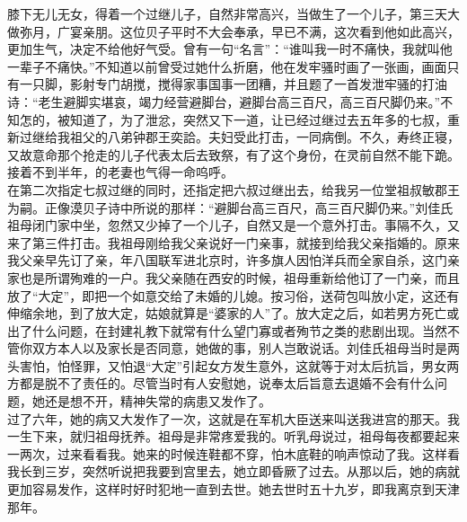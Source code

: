 膝下无儿无女，得着一个过继儿子，自然非常高兴，当做生了一个儿子，第三天大做弥月，广宴亲朋。这位贝子平时不大会奉承，早已不满，这次看到他如此高兴，更加生气，决定不给他好气受。曾有一句“名言”：“谁叫我一时不痛快，我就叫他一辈子不痛快。”不知道以前曾受过她什么折磨，他在发牢骚时画了一张画，画面只有一只脚，影射专门胡搅，搅得家事国事一团糟，并且题了一首发泄牢骚的打油诗：“老生避脚实堪哀，竭力经营避脚台，避脚台高三百尺，高三百尺脚仍来。”不知怎的，被知道了，为了泄忿，突然又下一道，让已经过继过去五年多的七叔，重新过继给我祖父的八弟钟郡王奕詥。夫妇受此打击，一同病倒。不久，寿终正寝，又故意命那个抢走的儿子代表太后去致祭，有了这个身份，在灵前自然不能下跪。接着不到半年，的老妻也气得一命呜呼。\\

在第二次指定七叔过继的同时，还指定把六叔过继出去，给我另一位堂祖叔敏郡王为嗣。正像漠贝子诗中所说的那样：“避脚台高三百尺，高三百尺脚仍来。”刘佳氏祖母闭门家中坐，忽然又少掉了一个儿子，自然又是一个意外打击。事隔不久，又来了第三件打击。我祖母刚给我父亲说好一门亲事，就接到给我父亲指婚的。原来我父亲早先订了亲，年八国联军进北京时，许多旗人因怕洋兵而全家自杀，这门亲家也是所谓殉难的一户。我父亲随在西安的时候，祖母重新给他订了一门亲，而且放了“大定”，即把一个如意交给了未婚的儿媳。按习俗，送荷包叫放小定，这还有伸缩余地，到了放大定，姑娘就算是“婆家的人”了。放大定之后，如若男方死亡或出了什么问题，在封建礼教下就常有什么望门寡或者殉节之类的悲剧出现。当然不管你双方本人以及家长是否同意，她做的事，别人岂敢说话。刘佳氏祖母当时是两头害怕，怕怪罪，又怕退“大定”引起女方发生意外，这就等于对太后抗旨，男女两方都是脱不了责任的。尽管当时有人安慰她，说奉太后旨意去退婚不会有什么问题，她还是想不开，精神失常的病患又发作了。\\

过了六年，她的病又大发作了一次，这就是在军机大臣送来叫送我进宫的那天。我一生下来，就归祖母抚养。祖母是非常疼爱我的。听乳母说过，祖母每夜都要起来一两次，过来看看我。她来的时候连鞋都不穿，怕木底鞋的响声惊动了我。这样看我长到三岁，突然听说把我要到宫里去，她立即昏厥了过去。从那以后，她的病就更加容易发作，这样时好时犯地一直到去世。她去世时五十九岁，即我离京到天津那年。\\

